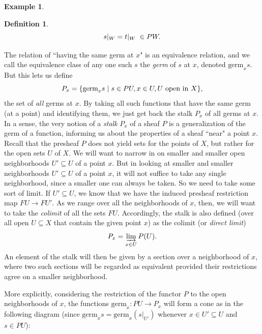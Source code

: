\documentclass[a4paper]{book}
\theoremstyle{definition}
\newtheorem{example}{Example}[section]
\theoremstyle{definition}
\newtheorem{definition}{Definition}[section]
\theoremstyle{definition}
\theoremstyle{theorem}
\theoremstyle{definition}
\begin{document}
\begin{example}
\begin{definition}
	\begin{equation*} 
	s|_{W} = t|_{W} \hspace*{0.3em }\in PW.
	\end{equation*} 
	\end{definition} \noindent 
	The relation of ``having the same germ at $x$" is an equivalence relation, and we call the equivalence class of any one such $s$ the \textit{germ} of $s$ at $x$, denoted $\text{germ}_x s$. But this lets us define
	\begin{equation}
	P_x = \{\text{germ}_x s \hspace*{0.3em}| \hspace*{0.3em} s \in PU, x \in U, U \text{ open in } X\},
	\end{equation} 
	the set of \textit{all} germs at $x$. By taking all such functions that have the same germ (at a point) and identifying them, we just get back the stalk $P_x$ of all germs at $x$. In a sense, the very notion of a \textit{stalk} $P_x$ of a sheaf $P$ is a generalization of the germ of a function, informing us about the properties of a sheaf ``near" a point $x$. Recall that the presheaf $P$ does not yield sets for the points of $X$, but rather for the open sets $U$ of $X$. We will want to narrow in on smaller and smaller open neighborhoods $U' \subseteq  U$ of a point $x$. But in looking at smaller and smaller neighborhoods $U' \subseteq  U$ of a point $x$, it will not suffice to take any single neighborhood, since a smaller one can always be taken. So we need to take some sort of limit. If $U' \subseteq  U$, we know that we have the induced presheaf restriction map $FU \rightarrow FU'$. As we range over all the neighborhoods of $x$, then, we will want to take the \textit{colimit} of all the sets $FU$. Accordingly, the stalk is also defined (over all open $U \subseteq  X$ that contain the given point $x$) as the colimit (or \textit{direct limit})
	\begin{equation}
	P_x = \varinjlim_{x \in U} P(U).
	\end{equation} 
	An element of the stalk will then be given by a section over a neighborhood of $x$, where two such sections will be regarded as equivalent provided their restrictions agree on a smaller neighborhood. \par 
	More explicitly, considering the restriction of the functor $P$ to the open neighborhoods of $x$, the functions $\text{germ}_x: PU \rightarrow P_x$ will form a cone as in the following diagram (since $\text{germ}_x s = \text{germ}_x (s|_{U'})$ whenever $x \in U' \subseteq U$ and $s \in PU$): 

\end{example}
\end{document}
